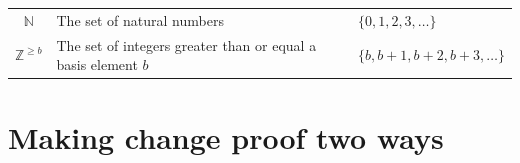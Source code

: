 \documentclass[12pt, oneside]{article}
\begin{document}
\vfill

\begin{center}
    \begin{tabular}{cll}
    $\mathbb{N}$  &  The set of  natural numbers & $\{ 0, 1, 2, 3, \ldots \}$ \\
$\mathbb{Z}^{\geq b}$ & The set of integers greater than  or equal  a  basis element $b$ & $\{ b, b+1, b+2, b+3,  \ldots  \}$ \\
    \end{tabular}
    \end{center}
    
    \vfill \vfill
\section*{Making change proof two ways}
\end{document}
